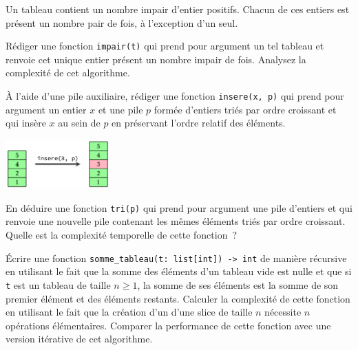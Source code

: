 \documentclass{magnoliaold}
\begin{document}
Un tableau contient un nombre impair d'entier positifs. Chacun de ces entiers est présent un
nombre pair de fois, à l'exception d'un seul.
\begin{questions}
\question Rédiger une fonction \verb!impair(t)! qui prend pour argument un tel tableau et
  renvoie cet unique entier présent un nombre impair de fois.
\question Analysez la complexité de cet algorithme.
\end{questions}

\begin{questions}
\question
À l'aide d'une pile auxiliaire, rédiger une fonction \verb!insere(x, p)! qui prend pour
argument un entier $x$ et une pile $p$ formée d'entiers triés par ordre croissant et qui
insère $x$ au sein de $p$ en préservant l'ordre relatif des éléments.
\begin{center}
\includegraphics[width=0.3\textwidth]{../../Commun/Images/python-exos-tableau-2.pdf}
\end{center}
\question En déduire une fonction \verb!tri(p)! qui prend pour argument une pile d'entiers
  et qui renvoie une nouvelle pile contenant les mêmes éléments triés par ordre croissant.
\question Quelle est la complexité temporelle de cette fonction~?
\end{questions}




Écrire une fonction \verb!somme_tableau(t: list[int]) -> int! de manière
récursive en utilisant le fait que la somme des éléments d'un tableau vide est
nulle et que si \verb!t! est un tableau de taille $n\geq 1$, la somme de ses
éléments est la somme de son premier élément et des éléments restants.
Calculer la complexité de cette fonction en utilisant le fait que la création d'un
d'une slice de taille $n$ nécessite $n$ opérations élémentaires.
Comparer la performance de cette fonction avec une version itérative de cet algorithme.
\end{document}
